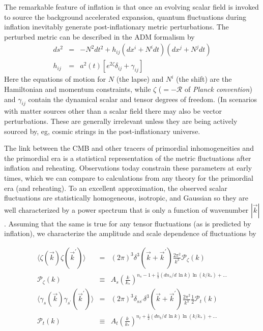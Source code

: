 The remarkable feature of inflation is that once an evolving scalar field is invoked to source the background accelerated expansion, quantum fluctuations during inflation inevitably generate post-inflationary metric perturbations. The perturbed metric can be described in the ADM formalism by
\begin{eqnarray}
ds^2&=&-N^2dt^2 +h_{ij}(dx^i+N^idt)(dx^j+N^jdt)\nonumber\\
h_{ij}&=&a^2(t)[e^{2\zeta}\delta_{ij}+\gamma_{ij}]
\end{eqnarray}
Here the equations of motion for $N$ (the lapse) and $N^i$ (the shift) are the Hamiltonian and momentum constraints, while $\zeta$ ($=-\mathcal{R}$ of {\it Planck convention}) and $\gamma_{ij}$ contain the dynamical scalar and tensor degrees of freedom. (In scenarios with matter sources other than a scalar field there may also be vector perturbations. These are generally irrelevant unless they are being actively sourced by, eg, cosmic strings in the post-inflationary universe. 

The link between the CMB and other tracers of primordial inhomogeneities and the primordial era is a statistical representation of the metric fluctuations after inflation and reheating. Observations today constrain these parameters at early times, which we can compare to calculations from any theory for the primordial era (and reheating). To an excellent approximation, the observed scalar fluctuations are statistically homogeneous, isotropic, and Gaussian so they are well characterized by a power spectrum that is only a function of wavenumber $|\vec{k}|$. Assuming that the same is true for any tensor fluctuations (as is predicted by inflation), we characterize the amplitude and scale dependence of fluctuations by

\begin{eqnarray}
\langle\zeta(\vec{k})\zeta(\vec{k}^{\prime})\rangle&=&(2\pi)^3\delta^3(\vec{k}+\vec{k}^{\prime})\frac{2\pi^2}{k^3}\mathcal{P}_{\zeta}(k)\nonumber\\
\mathcal{P}_{\zeta}(k)&\equiv& A_s\left(\frac{k}{k_*}\right)^{n_s-1+\frac{1}{2}(dn_s/d\,\ln k)\ln(k/k_*)+\dots}\nonumber\\
\langle\gamma_s(\vec{k})\gamma_{s^{\prime}}(\vec{k}^{\prime})\rangle&=&(2\pi)^3\delta_{ss^{\prime}}\delta^3(\vec{k}+\vec{k}^{\prime})\frac{2\pi^2}{k^3}\frac{1}{2}\mathcal{P}_{t}(k)\nonumber\\
\mathcal{P}_{t}(k)&\equiv& A_t \left(\frac{k}{k_*}\right)^{n_t+\frac{1}{2}(dn_t/d\,\ln k)\ln(k/k_*)+\dots}
\end{eqnarray}

